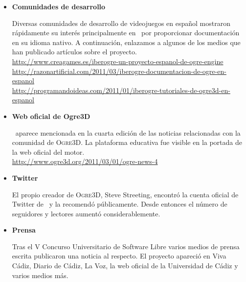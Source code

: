 \begin{itemize}
    \item \textbf{Comunidades de desarrollo}
    
    Diversas comunidades de desarrollo de videojuegos en español mostraron
    rápidamente su interés principalmente en \wiki\ por proporcionar
    documentación en su idioma nativo. A continuación, enlazamos a algunos
    de los medios que han publicado artículos sobre el proyecto.\\
    
    \url{http://www.creagames.es/iberogre-un-proyecto-espanol-de-ogre-engine}\\
    \url{http://razonartificial.com/2011/03/iberogre-documentacion-de-ogre-en-espanol}\\
    \url{http://programandoideas.com/2011/01/iberogre-tutoriales-de-ogre3d-en-espanol}\\
    
    \item \textbf{Web oficial de Ogre3D}
    
    \wiki\ aparece mencionada en la cuarta edición de las noticias relacionadas
    con la comunidad de \textsc{Ogre3D}. La plataforma educativa fue visible
    en la portada de la web oficial del motor.\\
    
    \url{http://www.ogre3d.org/2011/03/01/ogre-news-4}\\
    
    \item \textbf{Twitter}
    
    El propio creador de \textsc{Ogre3D}, Steve Streeting, encontró la cuenta
    oficial de Twitter de \wiki\ y la recomendó públicamente. Desde entonces
    el número de seguidores y lectores aumentó considerablemente.\\
    
    \item \textbf{Prensa}
    
    Tras el V Concurso Universitario de Software Libre varios medios
    de prensa escrita publicaron una noticia al respecto. El proyecto
    apareció en Viva Cádiz, Diario de Cádiz, La Voz, la web oficial
    de la Universidad de Cádiz y varios medios más.\\
\end{itemize}
